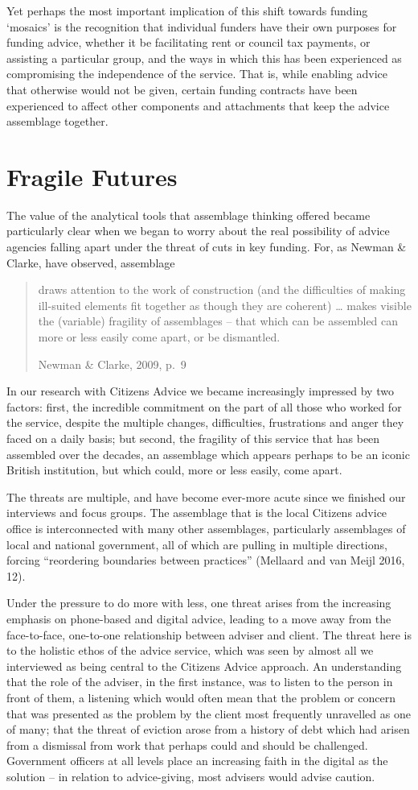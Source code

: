 \par
Yet perhaps the most important implication of this shift towards funding ‘mosaics’ is the recognition that individual funders have their own purposes for funding advice, whether it be facilitating rent or council tax payments, or assisting a particular group, and the ways in which this has been experienced as compromising the independence of the service. That is, while enabling advice that otherwise would not be given, certain funding contracts have been experienced to affect other components and attachments that keep the advice assemblage together.

\chapter{Fragile Futures}
The value of the analytical tools that assemblage thinking offered became particularly clear when we began to worry about the real possibility of advice agencies falling apart under the threat of cuts in key funding. For, as Newman \& Clarke, have observed, assemblage
    \blockquote[Newman \& Clarke, 2009, p.~9]{draws attention to the work of construction (and the difficulties of making ill-suited elements fit together as though they are coherent) … makes visible the (variable) fragility of assemblages – that which can be assembled can more or less easily come apart, or be dismantled.}
In our research with Citizens Advice we became increasingly impressed by two factors: first, the incredible commitment on the part of all those who worked for the service, despite the multiple changes, difficulties, frustrations and anger they faced on a daily basis; but second, the fragility of this service that has been assembled over the decades, an assemblage which appears perhaps to be an iconic British institution, but which could, more or less easily, come apart.
\par
The threats are multiple, and have become ever-more acute since we finished our interviews and focus groups. The assemblage that is the local Citizens advice office is interconnected with many other assemblages, particularly assemblages of local and national government, all of which are pulling in multiple directions, forcing “reordering boundaries between practices” (Mellaard and van Meijl 2016, 12). 
\par
Under the pressure to do more with less, one threat arises from the increasing emphasis on phone-based and digital advice, leading to a move away from the face-to-face, one-to-one relationship between adviser and client. The threat here is to the holistic ethos of the advice service, which was seen by almost all we interviewed as being central to the Citizens Advice approach. An understanding that the role of the adviser, in the first instance, was to listen to the person in front of them, a listening which would often mean that the problem or concern that was presented as the problem by the client most frequently unravelled as one of many; that the threat of eviction arose from a history of debt which had arisen from a dismissal from work that perhaps could and should be challenged. Government officers at all levels place an increasing faith in the digital as the solution – in relation to advice-giving, most advisers would advise caution. 
